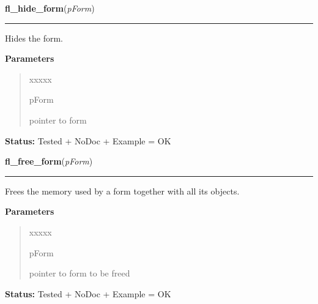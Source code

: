 \hspace{.8\funcindent}\begin{boxedminipage}{\funcwidth}

    \raggedright \textbf{fl\_hide\_form}(\textit{pForm})

    \vspace{-1.5ex}

    \rule{\textwidth}{0.5\fboxrule}
\setlength{\parskip}{2ex}
    Hides the form.

\setlength{\parskip}{1ex}
      \textbf{Parameters}
      \vspace{-1ex}

      \begin{quote}
        \begin{Ventry}{xxxxx}

          \item[pForm]

          pointer to form

        \end{Ventry}

      \end{quote}

\textbf{Status:} Tested + NoDoc + Example = OK



    \end{boxedminipage}

    \label{xformslib:library:fl_free_form}

    \vspace{0.5ex}

\hspace{.8\funcindent}\begin{boxedminipage}{\funcwidth}

    \raggedright \textbf{fl\_free\_form}(\textit{pForm})

    \vspace{-1.5ex}

    \rule{\textwidth}{0.5\fboxrule}
\setlength{\parskip}{2ex}
    Frees the memory used by a form together with all its objects.

\setlength{\parskip}{1ex}
      \textbf{Parameters}
      \vspace{-1ex}

      \begin{quote}
        \begin{Ventry}{xxxxx}

          \item[pForm]

          pointer to form to be freed

        \end{Ventry}

      \end{quote}

\textbf{Status:} Tested + NoDoc + Example = OK



    \end{boxedminipage}


